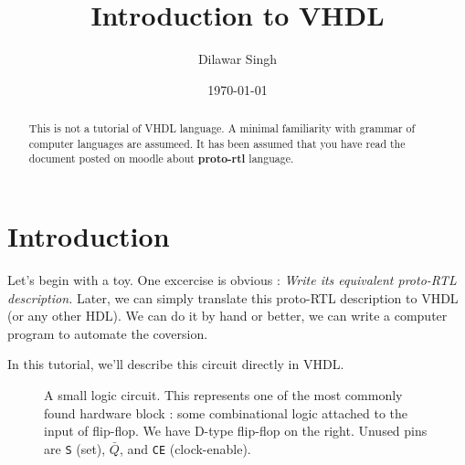 \documentclass[a4paper,10pt]{article}
\title{Introduction to VHDL}
\author{Dilawar Singh}
\date{\today}
\begin{document}
\maketitle

\begin{abstract}
  
  This is not a tutorial of VHDL language. A minimal familiarity with grammar of
  computer languages are assumeed. It has been assumed that you have read the
  document posted on moodle about \textbf{proto-rtl} language.

\end{abstract}

\section{Introduction}
  
 Let's begin with a toy. One excercise is obvious : \emph{Write its equivalent
 proto-RTL description.} Later, we can simply translate this proto-RTL
 description to VHDL (or any other HDL). We can do it by hand or better, we can
 write a computer program to automate the coversion.

 In this tutorial, we'll describe this circuit directly in VHDL.
 
  \begin{figure}[h]
    
    \begin{center}
    \end{center}

    \caption{A small logic circuit. This represents one of the most commonly
    found hardware block : some combinational logic attached to the input of
    flip-flop.  We have D-type flip-flop on the right. Unused pins are
    \texttt{S} (set), $\bar{Q}$, and \texttt{CE} (clock-enable).}
 
    \label{fig:circuit}
 
  \end{figure}
\end{document}
